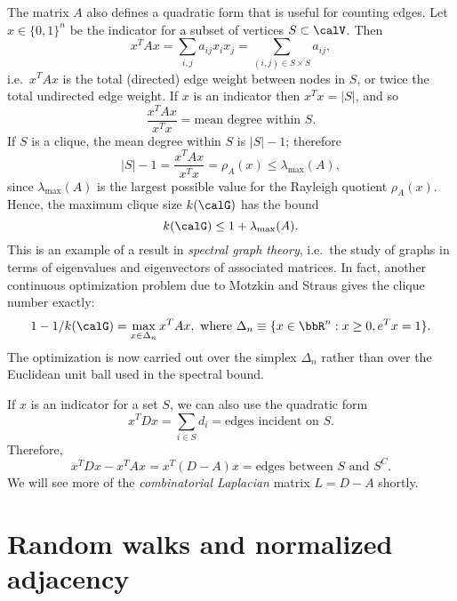 \documentclass[12pt, leqno]{article} %
\begin{document}
The matrix $A$ also defines a quadratic form that is useful for
counting edges.  Let $x \in \{0,1\}^n$ be the indicator for a subset
of vertices $S \subset \calV$.  Then
\[
  x^T A x
  = \sum_{i,j} a_{ij} x_i x_j
  = \sum_{(i,j) \in S \times S} a_{ij},
\]
i.e.~$x^T A x$ is the total (directed) edge weight between nodes in
$S$, or twice the total undirected edge weight.
If $x$ is an indicator then $x^T x = |S|$, and so
\[
  \frac{x^T A x}{x^T x} = \mbox{mean degree within } S.
\]
If $S$ is a clique, the mean degree within $S$ is $|S|-1$; therefore
\[
  |S|-1 = \frac{x^T A x}{x^T x} = \rho_A(x) \leq \lambda_{\max}(A),
\]
since $\lambda_{\max}(A)$ is the largest possible value for the
Rayleigh quotient $\rho_A(x)$.  Hence, the maximum clique size
$k(\calG)$ has the bound
\[
  k(\calG) \leq 1 + \lambda_{\max}(A).
\]
This is an example of a result in
{\em spectral graph theory}, i.e.~the study of graphs in terms of
eigenvalues and eigenvectors of associated matrices.  In fact,
another continuous optimization problem due to Motzkin and Straus
gives the clique number exactly:
\[
  1-1/k(\calG) = \max_{x \in \Delta_n} x^T A x, \mbox{ where }
  \Delta_n \equiv \{ x \in \bbR^n : x \geq 0, e^T x = 1 \}.
\]
The optimization is now carried out over the simplex $\Delta_n$
rather than over the Euclidean unit ball used in the spectral bound.

If $x$ is an indicator for a set $S$, we can also use the
quadratic form
\[
  x^T D x = \sum_{i \in S} d_i = \mbox{edges incident on } S.
\]
Therefore,
\[
  x^T D x - x^T A x = x^T (D-A) x = \mbox{edges between } S \mbox{ and } S^C.
\]
We will see more of the {\em combinatorial Laplacian} matrix
$L = D-A$ shortly.

\section{Random walks and normalized adjacency}
\end{document}
